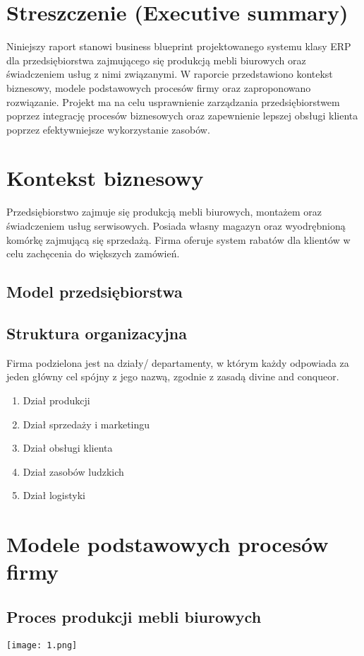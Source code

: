 \section{Streszczenie (Executive summary)}
Niniejszy raport stanowi business blueprint projektowanego systemu 
klasy ERP dla przedsiębiorstwa zajmującego się produkcją mebli biurowych 
oraz świadczeniem usług z nimi związanymi. W raporcie przedstawiono kontekst 
biznesowy, modele podstawowych procesów firmy oraz zaproponowano rozwiązanie.
 Projekt ma na celu usprawnienie zarządzania 
przedsiębiorstwem poprzez integrację procesów biznesowych oraz zapewnienie lepszej 
obsługi klienta poprzez efektywniejsze wykorzystanie zasobów.

\section{Kontekst biznesowy}
Przedsiębiorstwo zajmuje się produkcją mebli biurowych,
 montażem oraz świadczeniem usług serwisowych. Posiada własny magazyn 
 oraz wyodrębnioną komórkę zajmującą się sprzedażą.
 Firma oferuje system rabatów dla klientów w celu zachęcenia do większych zamówień.
\subsection{Model przedsiębiorstwa}

\subsection{Struktura organizacyjna}
Firma podzielona jest na działy/ departamenty,
 w którym każdy odpowiada za jeden główny cel spójny z jego nazwą,
 zgodnie z zasadą divine and conqueor.
\begin{enumerate}
    \item Dział produkcji
    \item Dział sprzedaży i marketingu
    \item Dział obsługi klienta
    \item Dział zasobów ludzkich
    \item Dział logistyki
\end{enumerate}

\section{Modele podstawowych procesów firmy}
\subsection{Proces produkcji mebli biurowych}
\begin{center}
    \texttt{[image: 1.png]}\\[0.5cm]
\end{center}

